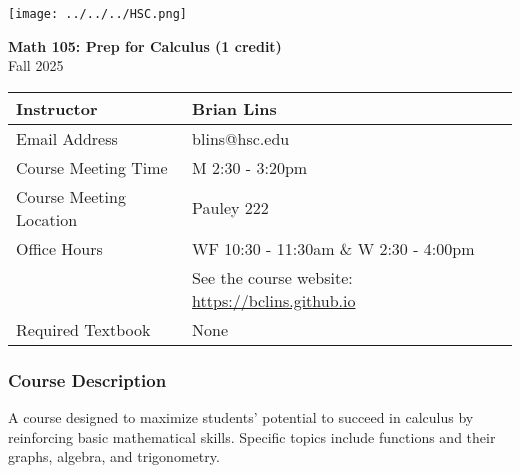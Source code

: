 \documentclass[10pt]{article}
\begin{document}
\noindent
%


\begin{center}
\texttt{[image: ../../../HSC.png]} 
\bigskip

\textbf{Math 105: Prep for Calculus (1 credit)} \\
Fall 2025
\end{center}

\noindent
\begin{tabular}{|l|l|}
\hline
Instructor & Brian Lins \\ \hline
Email Address & blins@hsc.edu \\ \hline
Course Meeting Time & M 2:30 - 3:20pm \\ \hline
Course Meeting Location & Pauley 222 \\ \hline
Office Hours & WF 10:30 - 11:30am \& W 2:30 - 4:00pm \\ 
& See the course website: \url{https://bclins.github.io} ~ \\ \hline
Required Textbook & None \\ \hline
\end{tabular}


\subsubsection*{Course Description}

A course designed to maximize students’ potential to succeed in calculus by reinforcing basic mathematical skills. Specific topics include functions and their graphs, algebra, and trigonometry.
\end{document}
